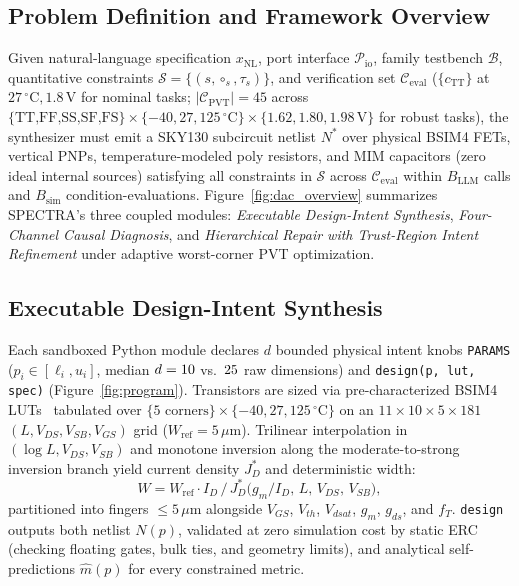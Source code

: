 \documentclass[sigconf,review,anonymous]{acmart}
\begin{document}
\subsection{Problem Definition and Framework Overview}
Given natural-language specification $x_{\text{NL}}$, port interface $\mathcal{P}_{\text{io}}$, family testbench $\mathcal{B}$, quantitative constraints $\mathcal{S} = \{(s, \circ_s, \tau_s)\}$, and verification set $\mathcal{C}_{\text{eval}}$ ($\{c_{\text{TT}}\}$ at $27\,^\circ\mathrm{C}, 1.8\,\mathrm{V}$ for nominal tasks; $|\mathcal{C}_{\text{PVT}}| = 45$ across $\{\text{TT,FF,SS,SF,FS}\} \times \{-40,27,125\,^\circ\mathrm{C}\} \times \{1.62,1.80,1.98\,\mathrm{V}\}$ for robust tasks), the synthesizer must emit a SKY130 subcircuit netlist $N^*$ over physical BSIM4 FETs, vertical PNPs, temperature-modeled poly resistors, and MIM capacitors (zero ideal internal sources) satisfying all constraints in $\mathcal{S}$ across $\mathcal{C}_{\text{eval}}$ within $B_{\text{LLM}}$ calls and $B_{\text{sim}}$ condition-evaluations. Figure~\ref{fig:dac_overview} summarizes \textsc{SPECTRA}'s three coupled modules: \emph{Executable Design-Intent Synthesis}, \emph{Four-Channel Causal Diagnosis}, and \emph{Hierarchical Repair with Trust-Region Intent Refinement} under adaptive worst-corner PVT optimization.

\subsection{Executable Design-Intent Synthesis}


Each sandboxed Python module declares $d$ bounded physical intent knobs \texttt{PARAMS} ($p_i \in [\ell_i, u_i]$, median $d=10{}$ vs.\ $25{}$ raw dimensions) and \texttt{design(p, lut, spec)} (Figure~\ref{fig:program}). Transistors are sized via pre-characterized BSIM4 LUTs~\cite{jespers2017gmid} tabulated over $\{5\text{ corners}\}\times\{-40,27,125\,^\circ\mathrm{C}\}$ on an $11\times 10\times 5\times 181$ $(L, V_{DS}, V_{SB}, V_{GS})$ grid ($W_{\text{ref}}=5\,\mu\mathrm{m}$). Trilinear interpolation in $(\log L, V_{DS}, V_{SB})$ and monotone inversion along the moderate-to-strong inversion branch yield current density $J_D^*$ and deterministic width:
\begin{equation}
  W = W_{\text{ref}} \cdot I_D \,/\, J_D^*\!\big(g_m/I_D,\, L,\, V_{DS},\, V_{SB}\big),
  \label{eq:dac_lut}
\end{equation}
partitioned into fingers $\le 5\,\mu\mathrm{m}$ alongside $V_{GS}$, $V_{th}$, $V_{dsat}$, $g_m$, $g_{ds}$, and $f_T$. \texttt{design} outputs both netlist $N(p)$, validated at zero simulation cost by static ERC (checking floating gates, bulk ties, and geometry limits), and analytical self-predictions $\hat{m}(p)$ for every constrained metric.
\end{document}
